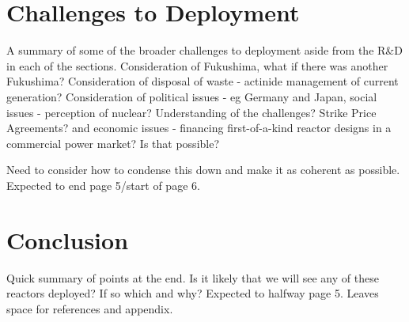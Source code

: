\documentclass[journal]{IEEEtran}
\begin{document}
\section{Challenges to Deployment}
A summary of some of the broader challenges to deployment aside from the R\&D in each of the sections.
Consideration of Fukushima, what if there was another Fukushima?
Consideration of disposal of waste - actinide management of current generation?
Consideration of political issues - eg Germany and Japan, social issues - perception of nuclear? Understanding of the challenges? Strike Price Agreements? and economic issues - financing first-of-a-kind reactor designs in a commercial power market? Is that possible?

Need to consider how to condense this down and make it as coherent as possible.
Expected to end page 5/start of page 6.
\section{Conclusion}
Quick summary of points at the end.
Is it likely that we will see any of these reactors deployed?
If so which and why?
Expected to halfway page 5.
Leaves space for references and appendix.




\appendices
\end{document}
